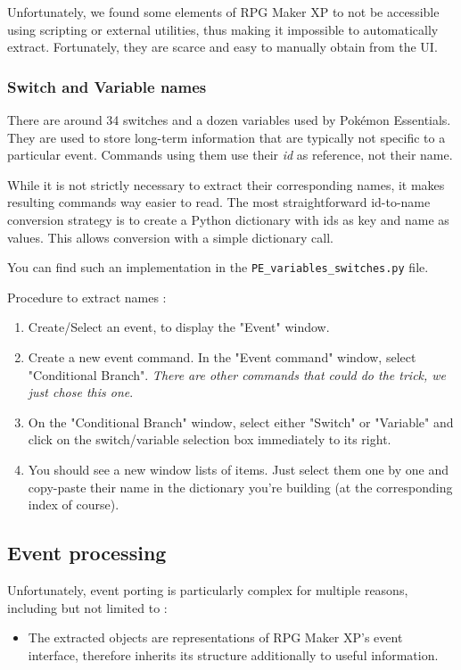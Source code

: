 \documentclass[11pt]{article}
\begin{document}
{Unfortunately, we found some elements of RPG Maker XP to not be accessible using scripting or external utilities, thus making it impossible to automatically extract. Fortunately, they are scarce and easy to manually obtain from the UI.

\subsubsection{Switch and Variable names}

There are around 34 switches and a dozen variables used by Pokémon Essentials. They are used to store long-term information that are typically not specific to a particular event. Commands using them use their \textit{id} as reference, not their name.

While it is not strictly necessary to extract their corresponding names, it makes resulting commands way easier to read. The most straightforward id-to-name conversion strategy is to create a Python dictionary with ids as key and name as values. This allows conversion with a simple dictionary call.

You can find such an implementation in the \verb|PE_variables_switches.py| file.

Procedure to extract names :
\begin{enumerate}
	\item Create/Select an event, to display the "Event" window.
	
	\item Create a new event command. In the "Event command" window, select "Conditional Branch". \textit{There are other commands that could do the trick, we just chose this one}.
	
	\item On the "Conditional Branch" window, select either "Switch" or "Variable" and click on the switch/variable selection box immediately to its right.
	
	\item You should see a new window lists of items. Just select them one by one and copy-paste their name in the dictionary you're building (at the corresponding index of course).
\end{enumerate}


\subsection{Event processing}

Unfortunately, event porting is particularly complex for multiple reasons, including but not limited to :
\begin{itemize}
	\item The extracted objects are representations of RPG Maker XP's event interface, therefore inherits its structure additionally to useful information.
	

\end{itemize}}
\end{document}
